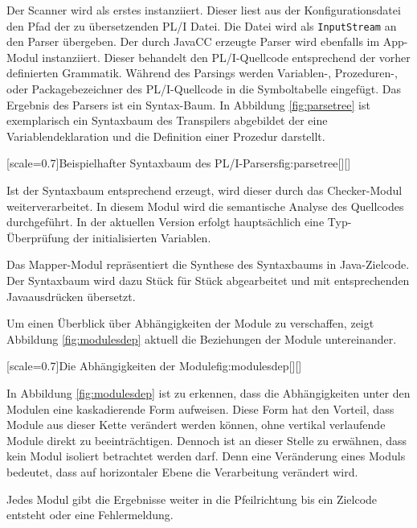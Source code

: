 Der Scanner wird als erstes instanziiert. Dieser liest aus der Konfigurationsdatei den Pfad der zu übersetzenden PL/I Datei. Die Datei wird als \verb+InputStream+ an den Parser übergeben.
\pagebreak
Der durch JavaCC erzeugte Parser wird ebenfalls im App-Modul instanziiert. Dieser behandelt den PL/I-Quellcode entsprechend der vorher definierten Grammatik.  Während des Parsings werden Variablen-, Prozeduren-, oder Packagebezeichner des PL/I-Quellcode in die Symboltabelle eingefügt. Das Ergebnis des Parsers ist ein Syntax-Baum. 
In Abbildung \ref{fig:parsetree} ist exemplarisch ein Syntaxbaum des Transpilers abgebildet der eine Variablendeklaration und die Definition einer Prozedur darstellt.

[scale=0.7]{Beispielhafter Syntaxbaum des PL/I-Parsers}{fig:parsetree}[][]

Ist der Syntaxbaum entsprechend erzeugt, wird dieser durch das Checker-Modul weiterverarbeitet. In diesem Modul wird die semantische Analyse des Quellcodes durchgeführt. In der aktuellen Version erfolgt hauptsächlich eine Typ-Überprüfung der initialisierten Variablen.

Das Mapper-Modul repräsentiert die Synthese des Syntaxbaums in Java-Zielcode. Der Syntaxbaum wird dazu Stück für Stück abgearbeitet und mit entsprechenden Javaausdrücken übersetzt.

Um einen Überblick über Abhängigkeiten der Module zu verschaffen, zeigt
Abbildung \ref{fig:modulesdep} aktuell die Beziehungen der Module untereinander.

[scale=0.7]{Die Abhängigkeiten der Module}{fig:modulesdep}[][]
\pagebreak

In Abbildung \ref{fig:modulesdep} ist zu erkennen, dass die Abhängigkeiten unter den Modulen eine kaskadierende Form aufweisen.
Diese Form hat den Vorteil, dass Module aus dieser Kette verändert werden können, ohne vertikal verlaufende Module direkt zu beeinträchtigen.
Dennoch ist an dieser Stelle zu erwähnen, dass kein Modul isoliert betrachtet werden darf. Denn eine Veränderung eines Moduls bedeutet, dass auf horizontaler 
Ebene die Verarbeitung verändert wird.

Jedes Modul gibt die Ergebnisse weiter in die Pfeilrichtung bis ein Zielcode entsteht oder eine Fehlermeldung.

